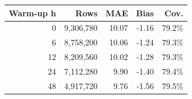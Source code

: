 \begin{tabular}{rrrrr}
\toprule
Warm-up h & Rows & MAE & Bias & Cov. \\
\midrule
0 & 9,306,780 & 10.07 & -1.16 & 79.2\% \\
6 & 8,758,200 & 10.06 & -1.24 & 79.3\% \\
12 & 8,209,560 & 10.02 & -1.28 & 79.3\% \\
24 & 7,112,280 & 9.90 & -1.40 & 79.4\% \\
48 & 4,917,720 & 9.76 & -1.56 & 79.5\% \\
\bottomrule
\end{tabular}
